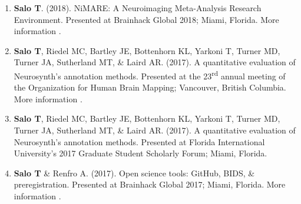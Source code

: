 \documentclass[10pt]{article}
\newcommand{\sectionstyle}{\LARGE \fontfamily{lmr}\selectfont}
\newcommand{\textlink}[3][blue]{\href{#2}{\color{#1}{#3}}}
\begin{document}
\begin{center}\sectionstyle{PRESENTATIONS}\end{center}

\begin{enumerate}

	\item \textbf{Salo T}.
	(2018).
	NiMARE: A Neuroimaging Meta-Analysis Research Environment.
	Presented at Brainhack Global 2018; Miami, Florida.
	More information \textlink{https://www.slideshare.net/TaylorSalo/nimarebrainhackglobalmiami}{here}.

	\item \textbf{Salo T}, Riedel MC, Bartley JE, Bottenhorn KL, Yarkoni T, Turner MD, Turner JA, Sutherland MT, \& Laird AR.
	(2017).
	A quantitative evaluation of Neurosynth's annotation methods.
	Presented at the 23\textsuperscript{rd} annual meeting of the Organization for Human Brain Mapping; Vancouver, British Columbia.
	More information \textlink{https://nbclab.github.io/presentations/salo-neurosynth-presentation}{here}.

	\item \textbf{Salo T}, Riedel MC, Bartley JE, Bottenhorn KL, Yarkoni T, Turner MD, Turner JA, Sutherland MT, \& Laird AR.
	(2017).
	A quantitative evaluation of Neurosynth's annotation methods.
	Presented at Florida International University's 2017 Graduate Student Scholarly Forum;
	Miami, Florida.

	\item \textbf{Salo T} \& Renfro A.
	(2017).
	Open science tools: GitHub, BIDS, \& preregistration.
	Presented at Brainhack Global 2017; Miami, Florida.
	More information \textlink{https://osf.io/557vf}{here}.

\end{enumerate}

\bigskip

\begin{center}\sectionstyle{POSTERS}\end{center}
\end{document}
